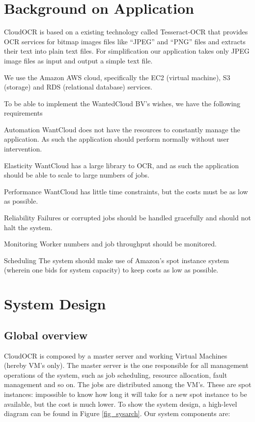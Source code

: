 \documentclass[a4paper]{IEEEtran}
\begin{document}
\section{Background on Application}
\label{sec:backgroundonapplication}
CloudOCR is based on a existing technology called Tesseract-OCR that provides OCR services for bitmap images files like ``JPEG'' and ``PNG'' files and extracts their text into plain text files. For simplification our application takes only JPEG image files as input and output a simple text file.

We use the Amazon AWS cloud, specifically the EC2 (virtual machine), S3 (storage) and RDS (relational database) services.

To be able to implement the WantedCloud BV's wishes, we have the following requirements
\begin{LaTeXdescription}
	\item[Automation] WantCloud does not have the resources to constantly manage the application. As such the application should perform normally without user intervention.
	\item[Elasticity] WantCloud has a large library to OCR, and as such the application should be able to scale to large numbers of jobs.
	\item[Performance] WantCloud has little time constraints, but the costs must be as low as possible.
	\item[Reliability] Failures or corrupted jobs should be handled gracefully and should not halt the system.
	\item[Monitoring] Worker numbers and job throughput should be monitored.
	\item[Scheduling] The system should make use of Amazon's spot instance system (wherein one bids for system capacity) to keep costs as low as possible.
\end{LaTeXdescription}

\section{System Design}
\label{sec:systemdesign}

\subsection*{Global overview}
CloudOCR is composed by a master server and working Virtual Machines (hereby VM's only). The master server is the one responsible for all management operations of the system, such as job  scheduling, resource allocation, fault management and so on. The jobs are distributed among the VM's. These are spot instances: impossible to know how long it will take for a new spot instance to be available, but the cost is much lower.
To show the system design, a high-level diagram can be found in Figure \ref{fig_sysarch}.
Our system components are:
\end{document}
